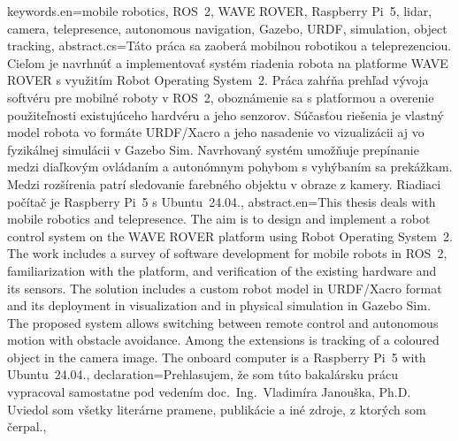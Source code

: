 {  keywords.en={mobile robotics, ROS~2, WAVE ROVER, Raspberry Pi~5, lidar, camera, telepresence, autonomous navigation, Gazebo, URDF, simulation, object tracking}, %
  abstract.cs={Táto práca sa zaoberá mobilnou robotikou a teleprezenciou. Cieľom je navrhnúť a implementovať systém riadenia robota na platforme WAVE ROVER s využitím Robot Operating System~2. Práca zahŕňa prehľad vývoja softvéru pre mobilné roboty v ROS~2, oboznámenie sa s platformou a overenie použiteľnosti existujúceho hardvéru a jeho senzorov. Súčasťou riešenia je vlastný model robota vo formáte URDF/Xacro a jeho nasadenie vo vizualizácii aj vo fyzikálnej simulácii v Gazebo Sim. Navrhovaný systém umožňuje prepínanie medzi diaľkovým ovládaním a autonómnym pohybom s vyhýbaním sa prekážkam. Medzi rozšírenia patrí sledovanie farebného objektu v obraze z kamery. Riadiaci počítač je Raspberry Pi~5 s Ubuntu~24.04.}, %
  abstract.en={This thesis deals with mobile robotics and telepresence. The aim is to design and implement a robot control system on the WAVE ROVER platform using Robot Operating System~2. The work includes a survey of software development for mobile robots in ROS~2, familiarization with the platform, and verification of the existing hardware and its sensors. The solution includes a custom robot model in URDF/Xacro format and its deployment in visualization and in physical simulation in Gazebo Sim. The proposed system allows switching between remote control and autonomous motion with obstacle avoidance. Among the extensions is tracking of a coloured object in the camera image. The onboard computer is a Raspberry Pi~5 with Ubuntu~24.04.}, %
  declaration={Prehlasujem, že som túto bakalársku prácu vypracoval samostatne pod vedením doc.\ Ing.\ Vladimíra Janouška, Ph.D.
Uviedol som všetky literárne pramene, publikácie a iné zdroje, z ktorých som čerpal.},
}
